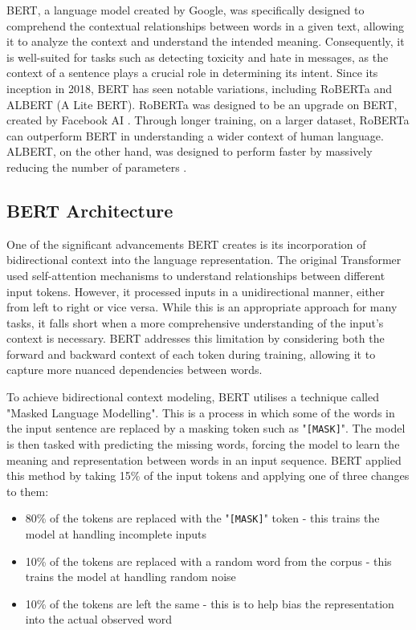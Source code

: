 BERT, a language model created by Google, was specifically designed to comprehend the contextual relationships between words in a given text, allowing it to analyze the context and understand the intended meaning. Consequently, it is well-suited for tasks such as detecting toxicity and hate in messages, as the context of a sentence plays a crucial role in determining its intent. Since its inception in 2018, BERT has seen notable variations, including RoBERTa and ALBERT (A Lite BERT). RoBERTa was designed to be an upgrade on BERT, created by Facebook AI \cite{RoBERTa}. Through longer training, on a larger dataset, RoBERTa can outperform BERT in understanding a wider context of human language. ALBERT, on the other hand, was designed to perform faster by massively reducing the number of parameters \cite{AlBERT}.

\subsection{BERT Architecture}

One of the significant advancements BERT creates is its incorporation of bidirectional context into the language representation. The original Transformer used self-attention mechanisms to understand relationships between different input tokens. However, it processed inputs in a unidirectional manner, either from left to right or vice versa. While this is an appropriate approach for many tasks, it falls short when a more comprehensive understanding of the input's context is necessary. BERT addresses this limitation by considering both the forward and backward context of each token during training, allowing it to capture more nuanced dependencies between words.

To achieve bidirectional context modeling, BERT utilises a technique called "Masked Language Modelling". This is a process in which some of the words in the input sentence are replaced by a masking token such as "\verb|[MASK]|". The model is then tasked with predicting the missing words, forcing the model to learn the meaning and representation between words in an input sequence. BERT applied this method by taking 15\% of the input tokens and applying one of three changes to them:

\begin{itemize}
    \item 80\% of the tokens are replaced with the "\verb|[MASK]|" token - this trains the model at handling incomplete inputs
    \item 10\% of the tokens are replaced with a random word from the corpus - this trains the model at handling random noise
    \item 10\% of the tokens are left the same - this is to help bias the representation into the actual observed word
\end{itemize}

